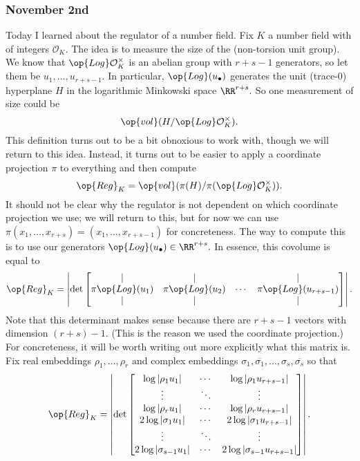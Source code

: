 \subsubsection{November 2nd}
Today I learned about the regulator of a number field. Fix $K$ a number field with of integers $\mathcal O_K.$ The idea is to measure the size of the (non-torsion unit group). We know that $\op{Log}\mathcal O_K^\times$ is an abelian group with $r+s-1$ generators, so let them be $u_1,\ldots,u_{r+s-1}.$ In particular, $\op{Log}(u_\bullet)$ generates the unit (trace-$0$) hyperplane $H$ in the logarithmic Minkowski space $\RR^{r+s}.$ So one measurement of size could be
\[\op{vol}(H/\op{Log}\mathcal O_K^\times).\]
This definition turns out to be a bit obnoxious to work with, though we will return to this idea. Instead, it turns out to be easier to apply a coordinate projection $\pi$ to everything and then compute
\[\op{Reg}_K=\op{vol}(\pi(H)/\pi(\op{Log}\mathcal O_K^\times)).\]
It should not be clear why the regulator is not dependent on which coordinate projection we use; we will return to this, but for now we can use $\pi(x_1,\ldots,x_{r+s})=(x_1,\ldots,x_{r+s-1})$ for concreteness. The way to compute this is to use our generators $\op{Log}(u_\bullet)\in\RR^{r+s}.$ In essence, this covolume is equal to
\[\op{Reg}_K=\left|\det\begin{bmatrix}
    | & | &  & | \\
    \pi\op{Log}(u_1) & \pi\op{Log}(u_2) & \cdots & \pi\op{Log}(u_{r+s-1}) \\
    | & | &  & |
\end{bmatrix}\right|.\]
Note that this determinant makes sense because there are $r+s-1$ vectors with dimension $(r+s)-1.$ (This is the reason we used the coordinate projection.) For concreteness, it will be worth writing out more explicitly what this matrix is. Fix real embeddings $\rho_1,\ldots,\rho_r$ and complex embeddings $\sigma_1,\overline{\sigma_1},\ldots,\sigma_s,\overline{\sigma_s}$ so that
\[\op{Reg}_K=\left|\det\begin{bmatrix}
    \log|\rho_1u_1| & \cdots & \log|\rho_1u_{r+s-1}| \\
    \vdots & \ddots & \vdots \\
    \log|\rho_ru_1| & \cdots & \log|\rho_ru_{r+s-1}| \\
    2\log|\sigma_1u_1| & \cdots & 2\log|\sigma_1u_{r+s-1}| \\
    \vdots & \ddots & \vdots \\
    2\log|\sigma_{s-1}u_1| & \cdots & 2\log|\sigma_{s-1}u_{r+s-1}|
\end{bmatrix}\right|.\]
